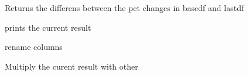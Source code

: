 \documentclass[letterpaper,10pt,english]{sphinxmanual}
\begin{document}
\begin{fulllineitems}
\begin{fulllineitems}
\label{\detokenize{vis/modelvis:modelvis.vis.difpct}}
\pysigstartsignatures
{}
\pysigstopsignatures
\sphinxAtStartPar
Returns the differens between the pct changes in basedf and lastdf

\end{fulllineitems}


\begin{fulllineitems}
\label{\detokenize{vis/modelvis:modelvis.vis.print}}
\pysigstartsignatures
{}
\pysigstopsignatures
\sphinxAtStartPar
prints the current result

\end{fulllineitems}


\begin{fulllineitems}
\label{\detokenize{vis/modelvis:modelvis.vis.show}}
\pysigstartsignatures
{}
\pysigstopsignatures
\end{fulllineitems}


\begin{fulllineitems}
\label{\detokenize{vis/modelvis:modelvis.vis.rename}}
\pysigstartsignatures
{}
\pysigstopsignatures
\sphinxAtStartPar
rename columns

\end{fulllineitems}


\begin{fulllineitems}
\label{\detokenize{vis/modelvis:modelvis.vis.mul}}
\pysigstartsignatures
{}
\pysigstopsignatures
\sphinxAtStartPar
Multiply the curent result with other


\end{fulllineitems}
\end{fulllineitems}
\end{document}
